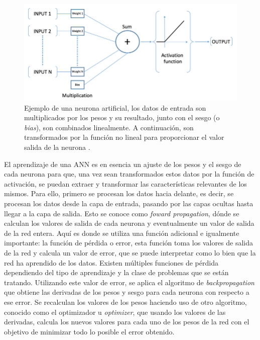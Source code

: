 \begin{figure}[h]
    \centering
    \includegraphics[width=\linewidth]{imagenes/theory/artificialNeuron.png}
    \caption[Ejemplo de una neurona artificial]{Ejemplo de una neurona artificial, los datos de entrada son multiplicados por los pesos y su resultado, junto con el sesgo (o \textit{bias}), son combinados linealmente. A continuación, son transformados por la función no lineal para proporcionar el valor salida de la neurona \cite{artificialNeuron}.}
    \label{fig:artificialNeuronExample}
\end{figure}

El aprendizaje de una ANN es en esencia un ajuste de los pesos y el sesgo de cada neurona para que, una vez sean transformados estos datos por la función de activación, se puedan extraer y transformar las características relevantes de los mismos. Para ello, primero se procesan los datos hacia delante, es decir, se procesan los datos desde la capa de entrada, pasando por las capas ocultas hasta llegar a la capa de salida. Esto se conoce como \textit{foward propagation}, dónde se calculan los valores de salida de cada neurona y eventualmente un valor de salida de la red entera. Aquí es donde se utiliza una función adicional e igualmente importante: la función de pérdida o error, esta función toma los valores de salida de la red y calcula un valor de error, que se puede interpretar como lo bien que la red ha aprendido de los datos. Existen múltiples funciones de pérdida dependiendo del tipo de aprendizaje y la clase de problemas que se están tratando. Utilizando este valor de error, se aplica el algoritmo de \textit{backpropagation} que obtiene las derivadas de los pesos y sesgo para cada neurona con respecto a ese error. Se recalculan los valores de los pesos haciendo uso de otro algoritmo, conocido como el optimizador u \textit{optimizer}, que usando los valores de las derivadas, calcula los nuevos valores para cada uno de los pesos de la red con el objetivo de minimizar todo lo posible el error obtenido.

